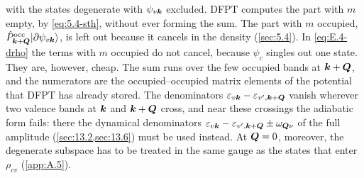 with the states degenerate with $\psi_{v\bm{k}}$ excluded. DFPT computes the part with $m$ empty, by \cref{eq:5.4-sth}, without ever forming the sum. The part with $m$ occupied, $\hat{P}^{\mathrm{occ}}_{\bm{k}+\bm{Q}}|\partial\psi_{v\bm{k}}\rangle$, is left out because it cancels in the density (\cref{sec:5.4}). In \cref{eq:E.4-drho} the terms with $m$ occupied do not cancel, because $\psi_c$ singles out one state. They are, however, cheap. The sum runs over the few occupied bands at $\bm{k}+\bm{Q}$, and the numerators are the occupied--occupied matrix elements of the potential that DFPT has already stored. The denominators $\varepsilon_{v\bm{k}} - \varepsilon_{v',\bm{k}+\bm{Q}}$ vanish wherever two valence bands at $\bm{k}$ and $\bm{k}+\bm{Q}$ cross, and near these crossings the adiabatic form fails: there the dynamical denominators $\varepsilon_{v\bm{k}} - \varepsilon_{v',\bm{k}+\bm{Q}} \pm \omega_{\bm{Q}\nu}$ of the full amplitude (\cref{sec:13.2,sec:13.6}) must be used instead. At $\bm{Q} = 0$, moreover, the degenerate subspace has to be treated in the same gauge as the states that enter $\rho_{cv}$ (\cref{app:A.5}).

